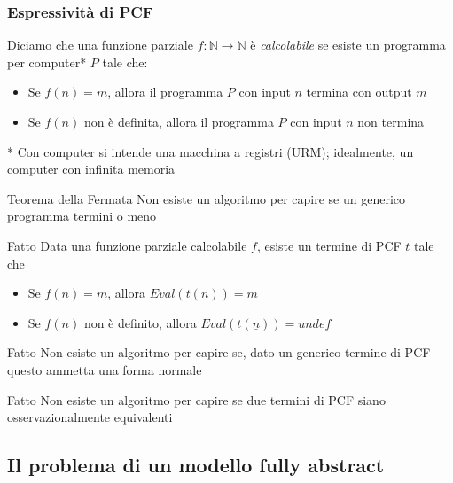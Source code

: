 \documentclass{beamer}
\begin{document}
\begin{frame}
	
	\frametitle{Espressività di PCF}
	
	Diciamo che una funzione parziale $f:\mathbb{N}\rightarrow \mathbb{N}$ è \emph{calcolabile} se esiste un programma per computer* $P$ tale che:
	\begin{itemize}
		\item Se $f(n)=m$, allora il programma $P$ con input $n$ termina con output $m$
		\item Se $f(n)$ non è definita, allora il programma $P$ con input $n$ non termina
	\end{itemize}
	
	* Con computer si intende una macchina a registri (URM); idealmente, un computer con infinita memoria
	
	\begin{block}{Teorema della Fermata}
		Non esiste un algoritmo per capire se un generico programma termini o meno
	\end{block}

	
\end{frame}


\begin{frame}
	
	\begin{block}{Fatto}
		Data una funzione parziale calcolabile $f$, esiste un termine di PCF $t$ tale che
		\begin{itemize}
			\item Se $f(n)=m$, allora $Eval(t(\underline{n}))=\underline{m}$
			\item Se $f(n)$ non è definito, allora $Eval(t(\underline{n}))=undef$
		\end{itemize}

	\end{block}
	
	\begin{block}{Fatto}
		Non esiste un algoritmo per capire se, dato un generico termine di PCF questo ammetta una forma normale
	\end{block}
	
	\begin{block}{Fatto}
		Non esiste un algoritmo per capire se due termini di PCF siano osservazionalmente equivalenti
	\end{block}

	
\end{frame}



\subsection{Il problema di un modello fully abstract}
\end{document}

